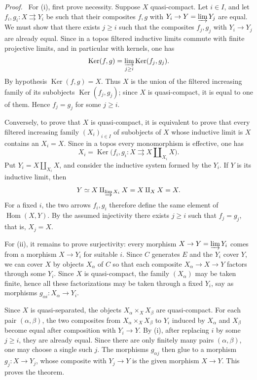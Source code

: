 \documentclass[11pt]{article}
\newcommand{\Hom}{\operatorname{Hom}}
\newcommand{\Ker}{\operatorname{Ker}}
\newenvironment{prooftext}{\par\noindent\emph{Proof.}\ }{\par\medskip}
\begin{document}
\begin{prooftext}
For (i), first prove necessity. Suppose \(X\) quasi-compact. Let \(i\in I\), and let \(f_i,g_i:X\rightrightarrows Y_i\) be such that their composites \(f,g\) with \(Y_i\to Y=\varinjlim Y_j\) are equal. We must show that there exists \(j\geq i\) such that the composites \(f_j,g_j\) with \(Y_i\to Y_j\) are already equal. Since in a topos filtered inductive limits commute with finite projective limits, and in particular with kernels, one has
\[
\Ker(f,g)=\varinjlim_{j\geq i}\Ker(f_j,g_j).
\]
By hypothesis \(\Ker(f,g)=X\). Thus \(X\) is the union of the filtered increasing family of its subobjects \(\Ker(f_j,g_j)\); since \(X\) is quasi-compact, it is equal to one of them. Hence \(f_j=g_j\) for some \(j\geq i\).

Conversely, to prove that \(X\) is quasi-compact, it is equivalent to prove that every filtered increasing family \((X_i)_{i\in I}\) of subobjects of \(X\) whose inductive limit is \(X\) contains an \(X_i=X\). Since in a topos every monomorphism is effective, one has
\[
X_i=\Ker\bigl(f_i,g_i:X\rightrightarrows X\amalg_{X_i}X\bigr).
\]
Put \(Y_i=X\amalg_{X_i}X\), and consider the inductive system formed by the \(Y_i\). If \(Y\) is its inductive limit, then
\[
Y\simeq X\amalg_{\varinjlim X_i}X=X\amalg_X X=X.
\]
For a fixed \(i\), the two arrows \(f_i,g_i\) therefore define the same element of \(\Hom(X,Y)\). By the assumed injectivity there exists \(j\geq i\) such that \(f_j=g_j\), that is, \(X_j=X\).

For (ii), it remains to prove surjectivity: every morphism \(X\to Y=\varinjlim Y_i\) comes from a morphism \(X\to Y_i\) for suitable \(i\). Since \(C\) generates \(E\) and the \(Y_i\) cover \(Y\), we can cover \(X\) by objects \(X_\alpha\) of \(C\) so that each composite \(X_\alpha\to X\to Y\) factors through some \(Y_i\). Since \(X\) is quasi-compact, the family \((X_\alpha)\) may be taken finite, hence all these factorizations may be taken through a fixed \(Y_i\), say as morphisms \(g_{\alpha i}:X_\alpha\to Y_i\).

Since \(X\) is quasi-separated, the objects \(X_\alpha\times_X X_\beta\) are quasi-compact. For each pair \((\alpha,\beta)\), the two composites from \(X_\alpha\times_X X_\beta\) to \(Y_i\) induced by \(X_\alpha\) and \(X_\beta\) become equal after composition with \(Y_i\to Y\). By (i), after replacing \(i\) by some \(j\geq i\), they are already equal. Since there are only finitely many pairs \((\alpha,\beta)\), one may choose a single such \(j\). The morphisms \(g_{\alpha j}\) then glue to a morphism \(g_j:X\to Y_j\), whose composite with \(Y_j\to Y\) is the given morphism \(X\to Y\). This proves the theorem.
\end{prooftext}
\end{document}
